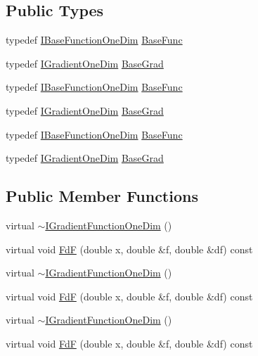 \subsection*{Public Types}
\begin{DoxyCompactItemize}
\item 
typedef \mbox{\hyperlink{classROOT_1_1Math_1_1IBaseFunctionOneDim}{I\+Base\+Function\+One\+Dim}} \mbox{\hyperlink{classROOT_1_1Math_1_1IGradientFunctionOneDim_a9eae6bcbeb2d0396937710bd70bd29d0}{Base\+Func}}
\item 
typedef \mbox{\hyperlink{classROOT_1_1Math_1_1IGradientOneDim}{I\+Gradient\+One\+Dim}} \mbox{\hyperlink{classROOT_1_1Math_1_1IGradientFunctionOneDim_ab15a5262f99475c3633de251f75fbd3f}{Base\+Grad}}
\item 
typedef \mbox{\hyperlink{classROOT_1_1Math_1_1IBaseFunctionOneDim}{I\+Base\+Function\+One\+Dim}} \mbox{\hyperlink{classROOT_1_1Math_1_1IGradientFunctionOneDim_a9eae6bcbeb2d0396937710bd70bd29d0}{Base\+Func}}
\item 
typedef \mbox{\hyperlink{classROOT_1_1Math_1_1IGradientOneDim}{I\+Gradient\+One\+Dim}} \mbox{\hyperlink{classROOT_1_1Math_1_1IGradientFunctionOneDim_ab15a5262f99475c3633de251f75fbd3f}{Base\+Grad}}
\item 
typedef \mbox{\hyperlink{classROOT_1_1Math_1_1IBaseFunctionOneDim}{I\+Base\+Function\+One\+Dim}} \mbox{\hyperlink{classROOT_1_1Math_1_1IGradientFunctionOneDim_a9eae6bcbeb2d0396937710bd70bd29d0}{Base\+Func}}
\item 
typedef \mbox{\hyperlink{classROOT_1_1Math_1_1IGradientOneDim}{I\+Gradient\+One\+Dim}} \mbox{\hyperlink{classROOT_1_1Math_1_1IGradientFunctionOneDim_ab15a5262f99475c3633de251f75fbd3f}{Base\+Grad}}
\end{DoxyCompactItemize}
\subsection*{Public Member Functions}
\begin{DoxyCompactItemize}
\item 
virtual \mbox{\hyperlink{classROOT_1_1Math_1_1IGradientFunctionOneDim_ad3f64fcee51e1e51e6db9126a402ed8a}{$\sim$\+I\+Gradient\+Function\+One\+Dim}} ()
\item 
virtual void \mbox{\hyperlink{classROOT_1_1Math_1_1IGradientFunctionOneDim_a01eaedb2ae1dfa5722f11281acf7a72b}{FdF}} (double x, double \&f, double \&df) const
\item 
virtual \mbox{\hyperlink{classROOT_1_1Math_1_1IGradientFunctionOneDim_ad3f64fcee51e1e51e6db9126a402ed8a}{$\sim$\+I\+Gradient\+Function\+One\+Dim}} ()
\item 
virtual void \mbox{\hyperlink{classROOT_1_1Math_1_1IGradientFunctionOneDim_a01eaedb2ae1dfa5722f11281acf7a72b}{FdF}} (double x, double \&f, double \&df) const
\item 
virtual \mbox{\hyperlink{classROOT_1_1Math_1_1IGradientFunctionOneDim_ad3f64fcee51e1e51e6db9126a402ed8a}{$\sim$\+I\+Gradient\+Function\+One\+Dim}} ()
\item 
virtual void \mbox{\hyperlink{classROOT_1_1Math_1_1IGradientFunctionOneDim_a01eaedb2ae1dfa5722f11281acf7a72b}{FdF}} (double x, double \&f, double \&df) const
\end{DoxyCompactItemize}


